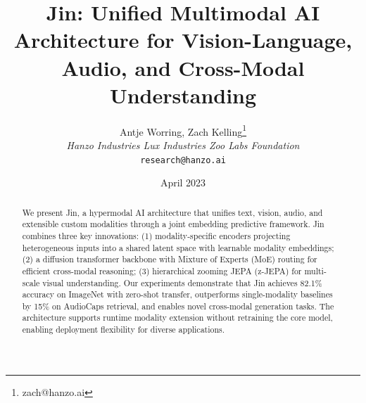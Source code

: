 \documentclass[11pt,twocolumn]{article}
\title{Jin: Unified Multimodal AI Architecture for Vision-Language, Audio, and Cross-Modal Understanding}
\author{Antje Worring, Zach Kelling\thanks{zach@hanzo.ai} \\ \textit{Hanzo Industries \quad Lux Industries \quad Zoo Labs Foundation} \\ \texttt{research@hanzo.ai}}
\date{April 2023}
\begin{document}
\hanzocoverpage

\begin{abstract}
We present Jin, a hypermodal AI architecture that unifies text, vision, audio, and extensible custom modalities through a joint embedding predictive framework. Jin combines three key innovations: (1) modality-specific encoders projecting heterogeneous inputs into a shared latent space with learnable modality embeddings; (2) a diffusion transformer backbone with Mixture of Experts (MoE) routing for efficient cross-modal reasoning; (3) hierarchical zooming JEPA (z-JEPA) for multi-scale visual understanding. Our experiments demonstrate that Jin achieves 82.1\% accuracy on ImageNet with zero-shot transfer, outperforms single-modality baselines by 15\% on AudioCaps retrieval, and enables novel cross-modal generation tasks. The architecture supports runtime modality extension without retraining the core model, enabling deployment flexibility for diverse applications.
\end{abstract}









\end{document}
